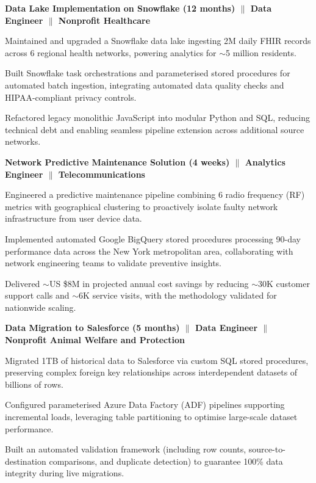 
{\textbf{Data Lake Implementation on Snowflake (12 months) $\|$ Data Engineer $\|$ Nonprofit Healthcare}}

\begin{zitemize}
 \item Maintained and upgraded a Snowflake data lake ingesting 2M daily FHIR records across 6 regional health networks, powering analytics for $\sim$5 million residents.

\item Built Snowflake task orchestrations and parameterised stored procedures for automated batch ingestion, integrating automated data quality checks and HIPAA-compliant privacy controls.

\item Refactored legacy monolithic JavaScript into modular Python and SQL, reducing technical debt and enabling seamless pipeline extension across additional source networks.

\end{zitemize}

{\textbf{Network Predictive Maintenance Solution (4 weeks) $\|$ Analytics Engineer $\|$ Telecommunications}}

\begin{zitemize}
\item Engineered a predictive maintenance pipeline combining 6 radio frequency (RF) metrics with geographical clustering to proactively isolate faulty network infrastructure from user device data.

\item Implemented automated Google BigQuery stored procedures processing 90-day performance data across the New York metropolitan area, collaborating with network engineering teams to validate preventive insights.

\item Delivered $\sim$US \$8M in projected annual cost savings by reducing $\sim$30K customer support calls and $\sim$6K service visits, with the methodology validated for nationwide scaling.

\end{zitemize}


{\textbf{Data Migration to Salesforce (5 months) $\|$ Data Engineer $\|$ Nonprofit Animal Welfare and Protection}}
\begin{zitemize}
\item Migrated 1TB of historical data to Salesforce via custom SQL stored procedures, preserving complex foreign key relationships across interdependent datasets of billions of rows.

\item Configured parameterised Azure Data Factory (ADF) pipelines supporting incremental loads, leveraging table partitioning to optimise large-scale dataset performance.

\item Built an automated validation framework (including row counts, source-to-destination comparisons, and duplicate detection) to guarantee 100\% data integrity during live migrations.
\end{zitemize}
